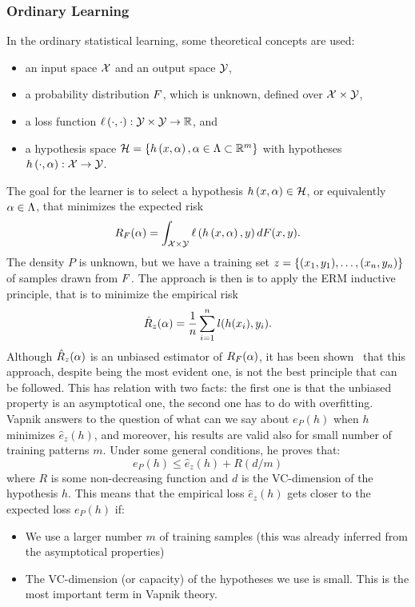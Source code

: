 \subsubsection*{Ordinary Learning}
In the ordinary statistical learning, some theoretical concepts are used:
\begin{itemize}
    \item an input space $\mathcal{X}$ and an output space $\mathcal{Y}$,
    \item a probability distribution $F$, which is unknown, defined over $\mathcal{X} \times \mathcal{Y}$,
    \item a loss function $\ell\left( \cdot, \cdot\right):\mathcal{Y} \times \mathcal{Y} \to \mathbb{R}$, and
    \item a hypothesis space $\mathcal{H} = \left\{h\left(x, \alpha\right), \alpha \in \Lambda \subset \mathbb{R}^m\right\}$ with hypotheses $h\left(\cdot, \alpha\right): \mathcal{X} \to \mathcal{Y}$.
\end{itemize}
The goal for the learner is to select a hypothesis $h\left(x, \alpha\right) \in \mathcal{H}$, or equivalently $\alpha \in \Lambda$, that minimizes the expected risk
$$ R_F(\alpha) =  \int_{\mathcal{X} \times \mathcal{Y}} \ell\left( h\left(x, \alpha\right), y\right) dF(x, y) .$$
The density $P$ is unknown, but we have a training set $z = \{(x_1, y_1), \ldots, (x_n, y_n)\}$ of samples drawn from $F$. 
The approach is then is to apply the ERM inductive principle, that is to minimize the empirical risk
$$ \hat{R}_z(\alpha) = \frac{1}{n} \sum_{i=1}^n l(h(x_i), y_i).$$
Although $\hat{R}_z(\alpha)$ is an unbiased estimator of $R_F(\alpha)$, it has been shown~\cite{vapnik2013nature} that this approach, despite being the most evident one, is not the best principle that can be followed.
This has relation with two facts: the first one is that the unbiased property is an asymptotical one, the second one has to do with overfitting.
Vapnik answers to the question of what can we say about $e_P(h)$ when $h$ minimizes $\hat{e}_z(h)$, and moreover, his results are valid also for small number of training patterns $m$.
Under some general conditions, he proves that:
\begin{equation}\label{eq:classic_bound}
    e_P(h) \leq \hat{e}_z(h) + R(d/m)
\end{equation}
where $R$ is some non-decreasing function and $d$ is the VC-dimension of the hypothesis $h$. This means that the empirical loss $\hat{e}_z(h)$ gets closer to the expected loss $e_P(h)$ if:
\begin{itemize}
    \item We use a larger number $m$ of training samples (this was already inferred from the asymptotical properties)
    \item The VC-dimension (or capacity) of the hypotheses we use is small. This is the most important term in Vapnik theory.
\end{itemize}
